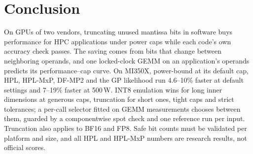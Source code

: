 \documentclass[conference]{IEEEtran}
\newcommand{\W}{\,W}
\newcommand{\pct}{\%}
\begin{document}
\section{Conclusion}\label{sec:conclusion}

On GPUs of two vendors, truncating unused mantissa bits in software buys performance for HPC applications under power
caps while each code's own accuracy check passes. The saving comes from bits that change between neighboring operands,
and one locked-clock GEMM on an application's operands predicts its performance--cap curve. On MI350X, power-bound at its
default cap, HPL, HPL-MxP, DF-MP2 and the GP likelihood run 4.6--10\pct{} faster at default settings and 7--19\pct{}
faster at 500\W. INT8 emulation wins for long inner dimensions at generous caps, truncation for short ones, tight caps
and strict tolerances; a per-call selector fitted on GEMM measurements chooses between them, guarded by a componentwise
spot check and one reference run per input. Truncation also applies to BF16 and FP8. Safe bit counts must be validated
per platform and size, and all HPL and HPL-MxP numbers are research results, not official scores.




\end{document}
